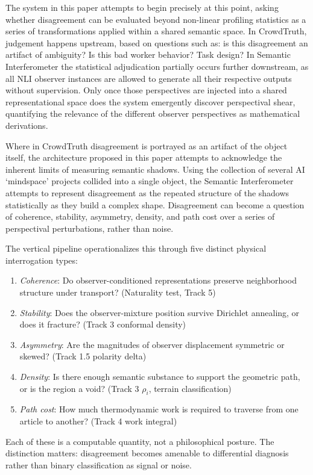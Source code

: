 The system in this paper attempts to begin precisely at this point, asking whether disagreement can be evaluated beyond non-linear profiling statistics as a series of transformations applied within a shared semantic space. In CrowdTruth, judgement happens upstream, based on questions such as: is this disagreement an artifact of ambiguity? Is this bad worker behavior? Task design? In Semantic Interferometer the statistical adjudication partially occurs further downstream, as all NLI observer instances are allowed to generate all their respective outputs without supervision. Only once those perspectives are injected into a shared representational space does the system emergently discover perspectival shear, quantifying the relevance of the different observer perspectives as mathematical derivations.

Where in CrowdTruth disagreement is portrayed as an artifact of the object itself, the architecture proposed in this paper attempts to acknowledge the inherent limits of measuring semantic shadows. Using the collection of several AI `mindspace' projects collided into a single object, the Semantic Interferometer attempts to represent disagreement as the repeated structure of the shadows statistically as they build a complex shape. Disagreement can become a question of coherence, stability, asymmetry, density, and path cost over a series of perspectival perturbations, rather than noise.

The vertical pipeline operationalizes this through five distinct physical interrogation types:
\begin{enumerate}
    \item \emph{Coherence}: Do observer-conditioned representations preserve neighborhood structure under transport? (Naturality test, Track 5)
    \item \emph{Stability}: Does the observer-mixture position survive Dirichlet annealing, or does it fracture? (Track 3 conformal density)
    \item \emph{Asymmetry}: Are the magnitudes of observer displacement symmetric or skewed? (Track 1.5 polarity delta)
    \item \emph{Density}: Is there enough semantic substance to support the geometric path, or is the region a void? (Track 3 $\rho_i$, terrain classification)
    \item \emph{Path cost}: How much thermodynamic work is required to traverse from one article to another? (Track 4 work integral)
\end{enumerate}
Each of these is a computable quantity, not a philosophical posture. The distinction matters: disagreement becomes amenable to differential diagnosis rather than binary classification as signal or noise.

